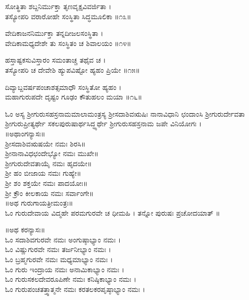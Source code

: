 ಸೋತ್ಥಿತಾ ಶಬ್ದನಿರ್ಮುಕ್ತಾ ತೃಣವೃಕ್ಷವಿವರ್ಜಿತಾ ।\\
ತಸ್ಯೋಪರಿ ವರಾರೋಹೇ ಸಂಸ್ಥಿತಾ ಸಿದ್ಧಮೂಲಿಕಾ ॥೧೩॥

ವೇದಿಕಾಜನನಿರ್ಮುಕ್ತಾ ತನ್ನದೀಜಲಸಂಸ್ಥಿತಾ ।\\
ವೇದಿಕಾಮಧ್ಯದೇಶೇ ತು ಸಂಸ್ಥಿತಂ ಚ ಶಿವಾಲಯಂ ॥೧೪॥

ಹಸ್ತಾಷ್ಟಕಸುವಿಸ್ತಾರಂ ಸಮಂತಾಚ್ಚ ತಥೈವ ಚ ।\\
ತಸ್ಯೋಪರಿ ಚ ದೇವೇಶಿ ಹ್ಯುಪವಿಷ್ಟೋ ಹ್ಯಹಂ ಪ್ರಿಯೇ ॥೧೫॥

ದಿವ್ಯಾಬ್ದವರ್ಷಪಂಚಾಶತ್ಸಮಾಧೌ ಸಂಸ್ಥಿತೋ ಹ್ಯಹಂ ।\\
ಮಹಾಗುರುಪದೇ ದೃಷ್ಟಂ ಗೂಢಂ ಕೌತುಹಲಂ ಮಯಾ ॥೧೬॥

ಓಂ ಅಸ್ಯ ಶ್ರೀಗುರುಸಹಸ್ರನಾಮಮಾಲಾಮಂತ್ರಸ್ಯ ಶ್ರೀಸದಾಶಿವಋಷಿಃ ನಾನಾವಿಧಾನಿ ಛಂದಾಂಸಿ ಶ್ರೀಗುರುರ್ದೇವತಾ ಶ್ರೀಗುರುಪ್ರೀತ್ಯರ್ಥೇ ಸಕಲಪುರುಷಾರ್ಥಸಿದ್ಧ್ಯರ್ಥೇ ಶ್ರೀಗುರುಸಹಸ್ರನಾಮ ಜಪೇ ವಿನಿಯೋಗಃ ।\\
॥ಅಥಾಂಗನ್ಯಾಸಃ॥\\
ಶ್ರೀಸದಾಶಿವಋಷಯೇ ನಮಃ ಶಿರಸಿ॥\\
ಶ್ರೀನಾನಾವಿಧಛಂದೇಭ್ಯೋ ನಮಃ ಮುಖೇ॥\\
ಶ್ರೀಗುರುದೇವತಾಯೈ ನಮಃ ಹೃದಯೇ॥\\
ಶ್ರೀ ಹಂ ಬೀಜಾಯ ನಮಃ ಗುಹ್ಯೇ॥\\
ಶ್ರೀ ಶಂ ಶಕ್ತಯೇ ನಮಃ ಪಾದಯೋಃ॥\\
ಶ್ರೀ ಕ್ರೌಂ ಕೀಲಕಾಯ ನಮಃ ಸರ್ವಾಂಗೇ॥\\

॥ಅಥ ಗುರುಗಾಯತ್ರೀಮಂತ್ರಃ॥\\
ಓಂ ಗುರುದೇವಾಯ ವಿದ್ಮಹೇ ಪರಮಗುರವೇ ಚ ಧೀಮಹಿ । ತನ್ನೋ ಪುರುಷಃ ಪ್ರಚೋದಯಾತ್ ॥

॥ಅಥ ಕರನ್ಯಾಸಃ॥\\
ಓಂ ಸದಾಶಿವಗುರವೇ ನಮಃ ಅಂಗುಷ್ಠಾಭ್ಯಾಂ ನಮಃ ।\\
ಓಂ ವಿಷ್ಣುಗುರವೇ ನಮಃ ತರ್ಜನೀಭ್ಯಾಂ ನಮಃ ।\\
ಓಂ ಬ್ರಹ್ಮಗುರವೇ ನಮಃ ಮಧ್ಯಮಾಭ್ಯಾಂ ನಮಃ ।\\
ಓಂ ಗುರು ಇಂದ್ರಾಯ ನಮಃ ಅನಾಮಿಕಾಭ್ಯಾಂ ನಮಃ ।\\
ಓಂ ಗುರುಸಕಲದೇವರೂಪಿಣೇ ನಮಃ ಕನಿಷ್ಠಿಕಾಭ್ಯಾಂ ನಮಃ ।\\
ಓಂ ಗುರುಪಂಚತತ್ತ್ವಾತ್ಮನೇ ನಮಃ ಕರತಲಕರಪೃಷ್ಠಾಭ್ಯಾಂ ನಮಃ ।\\

\\

